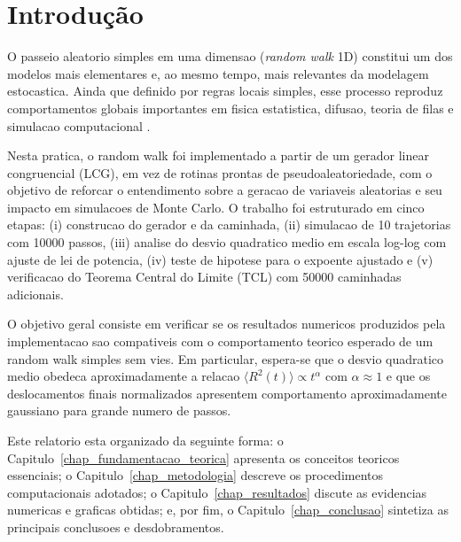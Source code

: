 
\chapter{Introdução}
\label{chap_introducao}

O passeio aleatorio simples em uma dimensao (\textit{random walk} 1D) constitui um dos modelos mais elementares e, ao mesmo tempo, mais relevantes da modelagem estocastica. Ainda que definido por regras locais simples, esse processo reproduz comportamentos globais importantes em fisica estatistica, difusao, teoria de filas e simulacao computacional \cite{mathworld_random_walk_1d}.

Nesta pratica, o random walk foi implementado a partir de um gerador linear congruencial (LCG), em vez de rotinas prontas de pseudoaleatoriedade, com o objetivo de reforcar o entendimento sobre a geracao de variaveis aleatorias e seu impacto em simulacoes de Monte Carlo. O trabalho foi estruturado em cinco etapas: (i) construcao do gerador e da caminhada, (ii) simulacao de 10 trajetorias com 10000 passos, (iii) analise do desvio quadratico medio em escala log-log com ajuste de lei de potencia, (iv) teste de hipotese para o expoente ajustado e (v) verificacao do Teorema Central do Limite (TCL) com 50000 caminhadas adicionais.

O objetivo geral consiste em verificar se os resultados numericos produzidos pela implementacao sao compativeis com o comportamento teorico esperado de um random walk simples sem vies. Em particular, espera-se que o desvio quadratico medio obedeca aproximadamente a relacao $\langle R^2(t)\rangle \propto t^{\alpha}$ com $\alpha \approx 1$ e que os deslocamentos finais normalizados apresentem comportamento aproximadamente gaussiano para grande numero de passos.

Este relatorio esta organizado da seguinte forma: o Capitulo~\ref{chap_fundamentacao_teorica} apresenta os conceitos teoricos essenciais; o Capitulo~\ref{chap_metodologia} descreve os procedimentos computacionais adotados; o Capitulo~\ref{chap_resultados} discute as evidencias numericas e graficas obtidas; e, por fim, o Capitulo~\ref{chap_conclusao} sintetiza as principais conclusoes e desdobramentos.

